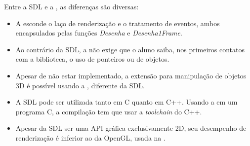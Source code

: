  Entre a SDL e a \playAPC, as diferenças são diversas:
 \begin{itemize}
 \item   A  \playAPC{}   esconde   o  laço   de  renderização   e
   o tratamento  de  eventos,  ambos  encapsulados  pelas  funções
   \emph{Desenha} e \emph{Desenha1Frame}.
 \item Ao  contrário da SDL, a  \playAPC{} não exige que  o aluno saiba,
   nos primeiros contatos com a biblioteca, o uso de ponteiros ou de objetos.
 \item Apesar de não estar implementado, a extensão para manipulação de
   objetos 3D é possível usando a \playAPC, diferente da SDL.
 \item A  SDL pode ser  utilizada tanto em  C quanto em C++.   Usando a
   \playAPC{}  em   um  programa  C,   a  compilação  tem  que   usar  a
   \emph{toolchain} do C++.
 \item  Apesar  da SDL  ser  uma  API  gráfica exclusivamente  2D,  seu
   desempenho  de  renderização  é  inferior  ao da  OpenGL,  usada  na
   \playAPC{} \cite{renoartigo}.

 \end{itemize}


